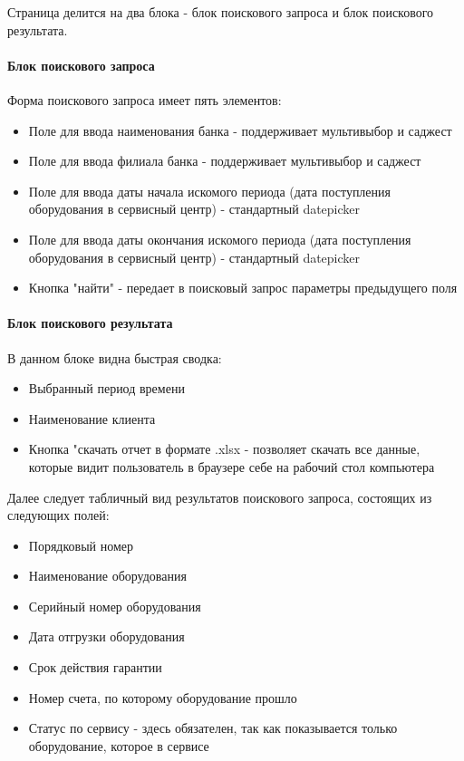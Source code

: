 \documentclass[DIV=calc, paper=a4, fontsize=11pt]{scrartcl} %
\begin{document}
Страница делится на два блока - блок поискового запроса и блок поискового результата.
\paragraph{Блок поискового запроса}
Форма поискового запроса имеет пять элементов:

\begin{itemize}
	\item Поле для ввода наименования банка - поддерживает мультивыбор и саджест
	\item Поле для ввода филиала банка - поддерживает мультивыбор и саджест
	\item Поле для ввода даты начала искомого периода (дата поступления оборудования в сервисный центр) - стандартный datepicker
	\item Поле для ввода даты окончания искомого периода (дата поступления оборудования в сервисный центр) - стандартный datepicker
	\item Кнопка "найти" - передает в поисковый запрос параметры предыдущего поля
\end{itemize}

\paragraph{Блок поискового результата}
В данном блоке видна быстрая сводка:

\begin{itemize}
	\item Выбранный период времени
	\item Наименование клиента
	\item Кнопка "скачать отчет в формате .xlsx - позволяет скачать все данные, которые видит пользователь в браузере себе на рабочий стол компьютера
\end{itemize}

Далее следует табличный вид результатов поискового запроса, состоящих из следующих полей:

\begin{itemize}
	\item Порядковый номер
	\item Наименование оборудования
	\item Серийный номер оборудования
	\item Дата отгрузки оборудования
	\item Срок действия гарантии
	\item Номер счета, по которому оборудование прошло
	\item Статус по сервису - здесь обязателен, так как показывается только оборудование, которое в сервисе
\end{itemize}
\end{document}
